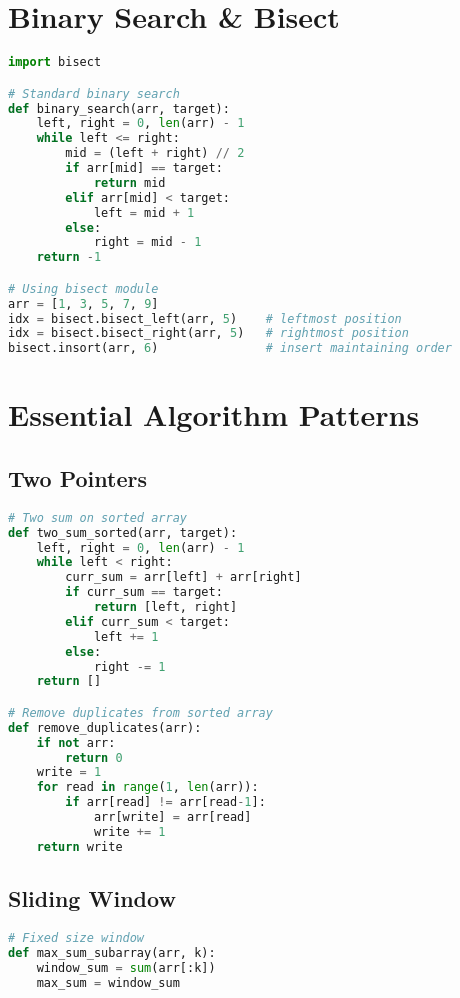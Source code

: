 \documentclass[9pt,a4paper]{article}
\begin{document}
\begin{multicols}{2}
\section*{Binary Search \& Bisect}
\begin{lstlisting}[language=Python]
import bisect

# Standard binary search
def binary_search(arr, target):
    left, right = 0, len(arr) - 1
    while left <= right:
        mid = (left + right) // 2
        if arr[mid] == target:
            return mid
        elif arr[mid] < target:
            left = mid + 1
        else:
            right = mid - 1
    return -1

# Using bisect module
arr = [1, 3, 5, 7, 9]
idx = bisect.bisect_left(arr, 5)    # leftmost position
idx = bisect.bisect_right(arr, 5)   # rightmost position
bisect.insort(arr, 6)               # insert maintaining order
\end{lstlisting}

\section*{Essential Algorithm Patterns}

\subsection*{Two Pointers}
\begin{lstlisting}[language=Python]
# Two sum on sorted array
def two_sum_sorted(arr, target):
    left, right = 0, len(arr) - 1
    while left < right:
        curr_sum = arr[left] + arr[right]
        if curr_sum == target:
            return [left, right]
        elif curr_sum < target:
            left += 1
        else:
            right -= 1
    return []

# Remove duplicates from sorted array
def remove_duplicates(arr):
    if not arr:
        return 0
    write = 1
    for read in range(1, len(arr)):
        if arr[read] != arr[read-1]:
            arr[write] = arr[read]
            write += 1
    return write
\end{lstlisting}

\subsection*{Sliding Window}
\begin{lstlisting}[language=Python]
# Fixed size window
def max_sum_subarray(arr, k):
    window_sum = sum(arr[:k])
    max_sum = window_sum
    

\end{lstlisting}
\end{multicols}
\end{document}

